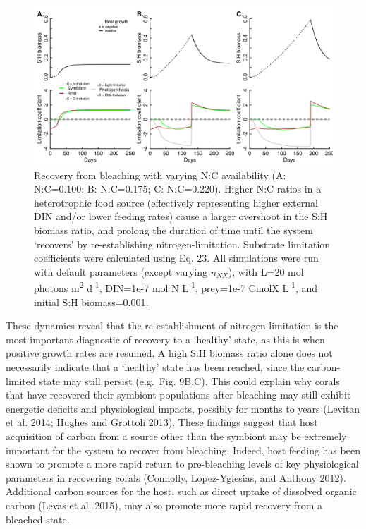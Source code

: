 \documentclass[]{elsarticle} %
\makeatletter
\def\maxwidth{\ifdim\Gin@nat@width>\linewidth\linewidth
\else\Gin@nat@width\fi}
\let\Oldincludegraphics\includegraphics
\renewcommand{\includegraphics}[1]{\Oldincludegraphics[width=\maxwidth]{#1}}
\makeatother
\begin{document}
\begin{figure}[htbp]
\centering
\includegraphics{../img/Fig9.png}
\caption{Recovery from bleaching with varying N:C availability (A:
N:C=0.100; B: N:C=0.175; C: N:C=0.220). Higher N:C ratios in a
heterotrophic food source (effectively representing higher external DIN
and/or lower feeding rates) cause a larger overshoot in the S:H biomass
ratio, and prolong the duration of time until the system `recovers' by
re-establishing nitrogen-limitation. Substrate limitation coefficients
were calculated using Eq. 23. All simulations were run with default
parameters (except varying \(n_{NX}\)), with L=20 mol photons
m\textsuperscript{2} d\textsuperscript{-1}, DIN=1e-7 mol N
L\textsuperscript{-1}, prey=1e-7 CmolX L\textsuperscript{-1}, and
initial S:H biomass=0.001.}
\end{figure}

These dynamics reveal that the re-establishment of nitrogen-limitation
is the most important diagnostic of recovery to a `healthy' state, as
this is when positive growth rates are resumed. A high S:H biomass ratio
alone does not necessarily indicate that a `healthy' state has been
reached, since the carbon-limited state may still persist (e.g.~Fig.
9B,C). This could explain why corals that have recovered their symbiont
populations after bleaching may still exhibit energetic deficits and
physiological impacts, possibly for months to years (Levitan et al.
2014; Hughes and Grottoli 2013). These findings suggest that host
acquisition of carbon from a source other than the symbiont may be
extremely important for the system to recover from bleaching. Indeed,
host feeding has been shown to promote a more rapid return to
pre-bleaching levels of key physiological parameters in recovering
corals (Connolly, Lopez-Yglesias, and Anthony 2012). Additional carbon
sources for the host, such as direct uptake of dissolved organic carbon
(Levas et al. 2015), may also promote more rapid recovery from a
bleached state.
\end{document}
